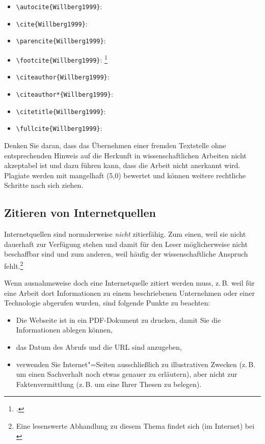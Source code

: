 \begin{itemize}
	\item \verb+\autocite{Willberg1999}+: \autocite{Willberg1999}
	\item \verb+\cite{Willberg1999}+: \cite{Willberg1999}
	\item \verb+\parencite{Willberg1999}+: \parencite{Willberg1999}
	\item \verb+\footcite{Willberg1999}+: \footcite{Willberg1999}
	\item \verb+\citeauthor{Willberg1999}+: \citeauthor{Willberg1999}
	\item \verb+\citeauthor*{Willberg1999}+: \citeauthor*{Willberg1999}
	\item \verb++: \citetitle{Willberg1999}
	\item \verb++: \fullcite{Willberg1999}
\end{itemize}

Denken Sie daran, dass das Übernehmen einer fremden Textstelle ohne entsprechenden Hinweis auf die Herkunft in wissenschaftlichen Arbeiten nicht akzeptabel ist und dazu führen kann, dass die Arbeit nicht anerkannt wird. Plagiate werden mit mangelhaft (5,0) bewertet und können weitere rechtliche Schritte nach sich ziehen.


\subsection{Zitieren von Internetquellen}

Internetquellen sind normalerweise \textit{nicht} zitierfähig. Zum einen, weil sie nicht dauerhaft zur Verfügung stehen und damit für den Leser möglicherweise nicht beschaffbar sind und zum anderen, weil häufig der wissenschaftliche Anspruch fehlt.\footnote{Eine lesenswerte Abhandlung zu diesem Thema findet sich (im Internet) bei \cite{Weber2006}}

Wenn ausnahmsweise doch eine Internetquelle zitiert werden muss, z.\,B. weil für eine Arbeit dort Informationen zu einem beschriebenen Unternehmen oder einer Technologie abgerufen wurden, sind folgende Punkte zu beachten:

\begin{itemize}
\item Die Webseite ist in ein PDF-Dokument zu drucken, damit Sie die Informationen ablegen können,
\item das Datum des Abrufs und die URL sind anzugeben,
\item verwenden Sie Internet"=Seiten ausschließlich zu illustrativen Zwecken (z.\,B. um einen Sachverhalt noch etwas genauer zu erläutern), aber nicht zur Faktenvermittlung (z.\,B. um eine Ihrer Thesen zu belegen).
\end{itemize}


